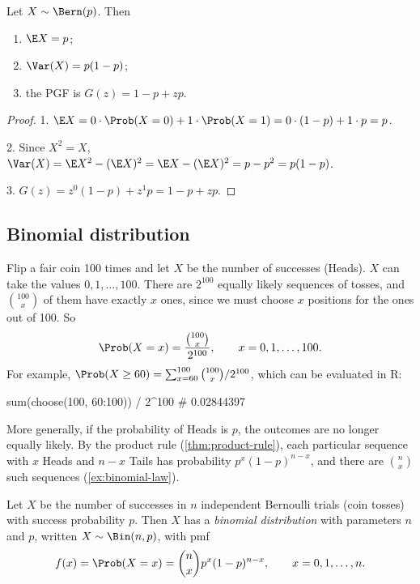 \begin{theorem}\label{thm:bernoulli-properties}
Let $X \sim \Bern(p)$. Then
\begin{enumerate}
  \item $\E X = p$;
  \item $\Var(X) = p(1-p)$;
  \item the PGF is $G(z) = 1 - p + zp$.
\end{enumerate}
\end{theorem}

\begin{proof}
1. $\E X = 0 \cdot \Prob(X = 0) + 1 \cdot \Prob(X = 1) = 0 \cdot (1-p) + 1 \cdot p = p$.

2. Since $X^2 = X$, $\Var(X) = \E X^2 - (\E X)^2 = \E X - (\E X)^2 = p - p^2 = p(1-p)$.

3. $G(z) = z^0 (1-p) + z^1 p = 1 - p + zp$.
\end{proof}

\subsection{Binomial distribution}\label{sec:binomial}

Flip a fair coin 100 times and let $X$ be the number of successes (Heads). $X$ can take the values $0, 1, \ldots, 100$. There are $2^{100}$ equally likely sequences of tosses, and $\binom{100}{x}$ of them have exactly $x$ ones, since we must choose $x$ positions for the ones out of 100. So
\[
  \Prob(X = x) = \frac{\binom{100}{x}}{2^{100}}, \qquad x = 0, 1, \ldots, 100.
\]
For example, $\Prob(X \ge 60) = \sum_{x=60}^{100} \binom{100}{x} / 2^{100}$, which can be evaluated in R:
\begin{rcode}
sum(choose(100, 60:100)) / 2^100    # 0.02844397
\end{rcode}

More generally, if the probability of Heads is $p$, the outcomes are no longer equally likely. By the product rule (\cref{thm:product-rule}), each particular sequence with $x$ Heads and $n - x$ Tails has probability $p^x (1-p)^{n-x}$, and there are $\binom{n}{x}$ such sequences (\cref{ex:binomial-law}).

\begin{definition}\label{def:binomial}
Let $X$ be the number of successes in $n$ independent Bernoulli trials (coin tosses) with success probability $p$. Then $X$ has a \emph{binomial distribution} with parameters $n$ and $p$, written $X \sim \Bin(n, p)$, with pmf
\[
  f(x) = \Prob(X = x) = \binom{n}{x} p^x (1-p)^{n-x}, \qquad x = 0, 1, \ldots, n.
\]
\end{definition}

